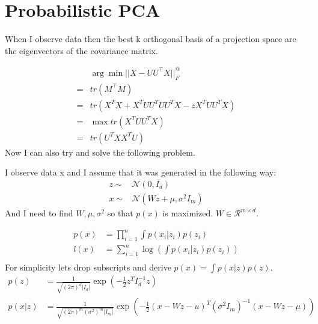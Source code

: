 \documentclass[11pt]{article}
\renewcommand{\det}[1]{|#1|}
\begin{document}
\raggedright
\section{Probabilistic PCA}

When I observe data then the best k orthogonal basis of a projection
space are the eigenvectors of the covariance matrix.

\begin{align}
&\arg\min ||X - UU^\top X ||^@_F \\
=&tr(M^\top M)\\
=&tr(X^TX + X^TUU^TUU^TX - zX^TUU^TX)\\
=& \max tr(X^TUU^TX) \\
=& tr(U^TXX^TU)
\end{align}
Now I can also try and solve the following problem.

I observe data x and I assume that it was generated in the following way:
\begin{align}
z \sim & \mathcal{N}(0, I_d)\\
x \sim & \mathcal{N}(Wz+\mu, \sigma^2 I_m)  
\end{align}
And I need to find $W, \mu, \sigma^2$ so that $p(x)$ is maximized. $W
\in \mathcal{R}^{m\times d}$.

\begin{align}
  p(x) &= \prod_{i=1}^n \int p(x_i | z_i) p(z_i)\\
  l(x) &= \sum_{i=1}^n \log(\int p(x_i|z_i) p(z_i)) \label{obj}\\
\end{align}
For simplicity lets drop subscripts and derive $p(x) = \int p(x|z) p(z)$.
\begin{align}
  p(z) &= \frac{1}{\sqrt{(2\pi)^d\det{I_d}}} \exp(-\frac{1}{2} z^T  I_d^{-1} z)\\
  p(x|z) &= \frac{1}{\sqrt{(2\pi)^m(\sigma^2)^m \det{I_m}}}
  \exp(-\frac{1}{2}(x-Wz-u)^T(\sigma^2I_m)^{-1}(x-Wz-\mu))
\end{align}
\end{document}
